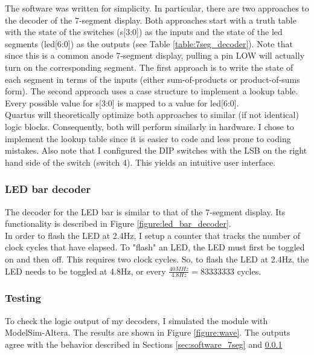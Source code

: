 \documentclass[11pt]{article}
\begin{document}
The software was written for simplicity. In particular, there are two approaches to the decoder of the 7-segment display. Both approaches start with a truth table with the state of the switches (s[3:0]) as the inputs and the state of the led segments (led[6:0]) as the outputs (see Table \ref{table:7seg_decoder}). Note that since this is a common anode 7-segment display, pulling a pin LOW will actually turn on the corresponding segment. The first approach is to write the state of each segment in terms of the inputs (either sum-of-products or product-of-sums form). The second approach uses a case structure to implement a lookup table. Every possible value for s[3:0] is mapped to a value for led[6:0]. \\

Quartus will theoretically optimize both approaches to similar (if not identical) logic blocks. Consequently, both will perform similarly in hardware. I chose to implement the lookup table since it is easier to code and less prone to coding mistakes. Also note that I configured the DIP switches with the LSB on the right hand side of the switch (switch 4). This yields an intuitive user interface. 


\subsubsection{LED bar decoder}
\label{sec:software_LEDbar}

The decoder for the LED bar is similar to that of the 7-segment display. Its functionality is described in Figure \ref{figure:led_bar_decoder}. \\

In order to flash the LED at 2.4Hz, I setup a counter that tracks the number of clock cycles that have elapsed. To "flash" an LED, the LED must first be toggled on and then off. This requires two clock cycles. So, to flash the LED at 2.4Hz, the LED needs to be toggled at 4.8Hz, or every $\frac{40MHz}{4.8Hz} = 83333333$ cycles. \\


\subsubsection{Testing}

To check the logic output of my decoders, I simulated the module with ModelSim-Altera. The results are shown in Figure \ref{figure:wave}. The outputs agree with the behavior described in Sections \ref{sec:software_7seg} and \ref{sec:software_LEDbar} \\
\end{document}
